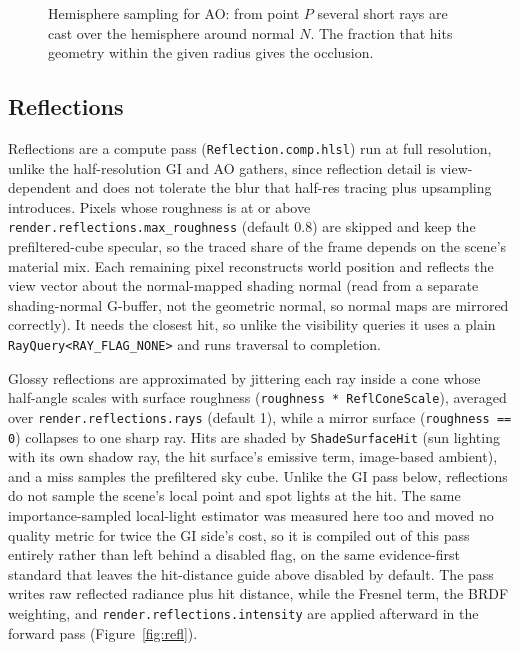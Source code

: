 \begin{figure}[tbp]
\centering
{}
\caption[Hemisphere sampling for ambient occlusion]{Hemisphere sampling for AO: from point $P$ several short rays are cast over the hemisphere
around normal $N$. The fraction that hits geometry within the given radius gives the occlusion.}
\label{fig:ao}
\end{figure}

\subsection{Reflections}

Reflections are a compute pass (\texttt{Reflection.comp.hlsl}) run at full resolution, unlike the
half-resolution GI and AO gathers, since reflection detail is view-dependent and does not
tolerate the blur that half-res tracing plus upsampling introduces. Pixels whose roughness is at or above \texttt{render.reflections.max\_roughness} (default 0.8) are
skipped and keep the prefiltered-cube specular, so the traced share of the frame depends on the
scene's material mix. Each remaining pixel reconstructs world
position and reflects the view vector about the normal-mapped shading normal (read from a separate
shading-normal G-buffer, not the geometric normal, so normal maps are mirrored correctly). It needs
the closest hit, so unlike the visibility queries it uses a plain \texttt{RayQuery<RAY_FLAG_NONE>}
and runs traversal to completion.

Glossy reflections are approximated by jittering each ray inside a cone whose half-angle scales with
surface roughness (\texttt{roughness * ReflConeScale}), averaged over \texttt{render.reflections.rays}
(default 1), while a mirror surface (\texttt{roughness == 0}) collapses to one sharp ray. Hits are
shaded by \texttt{ShadeSurfaceHit} (sun lighting with its own shadow ray, the hit surface's emissive
term, image-based ambient), and a miss samples the prefiltered sky cube. Unlike the GI pass below,
reflections do not sample the scene's local point and spot lights at the hit. The same
importance-sampled local-light estimator was measured here too and moved no quality metric for twice
the GI side's cost, so it is compiled out of this pass entirely rather than left behind a disabled
flag, on the same evidence-first standard that leaves the hit-distance guide above disabled by
default. The pass writes raw reflected radiance plus hit distance,
while the Fresnel term, the BRDF weighting, and \texttt{render.reflections.intensity} are applied
afterward in the forward pass (Figure~\ref{fig:refl}).

